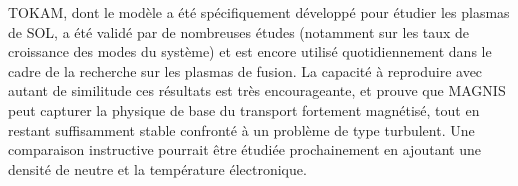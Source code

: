 \begin{refsection}
TOKAM, dont le modèle a été spécifiquement développé pour étudier les plasmas de
SOL, a été validé par de nombreuses études (notamment sur les taux de croissance
des modes du système) et est encore utilisé quotidiennement dans le cadre de la
recherche sur les plasmas de fusion. La capacité à reproduire avec autant de
similitude ces résultats est très encourageante, et prouve que MAGNIS peut
capturer la physique de base du transport fortement magnétisé, tout en restant suffisamment stable confronté à un
problème de type turbulent.
Une comparaison instructive pourrait être étudiée prochainement en ajoutant une
densité de neutre et la température électronique.

\end{refsection}
